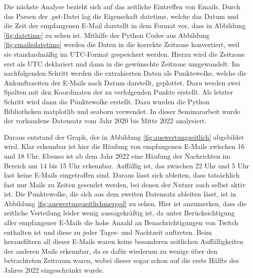 \noindent Die nächste Analyse bezieht sich auf das zeitliche Eintreffen von Emails. Durch das Parsen der .pst-Datei lag die Eigenschaft \glqq{}datetime\grqq, welche das Datum und die Zeit der empfangenen E-Mail darstellt in dem Format vor, dass in Abbildung \ref{fig:datetime} zu sehen ist. Mithilfe des Python Codes aus Abbildung \ref{fig:emailsdatetime} werden die Daten in die korrekte Zeitzone konvertiert, weil sie standardmäßig im UTC-Format gespeichert werden. Hierzu wird die Zeitzone erst als UTC deklariert und dann in die gewünschte Zeitzone umgewandelt. Im nachfolgenden Schritt werden die extrahierten Daten als Punktewolke, welche die Ankunftszeiten der E-Mails nach Datum darstellt, geplottet. Dazu werden zwei Spalten mit den Koordinaten der zu verfolgenden Punkte erstellt. Als letzter Schritt wird dann die Punktewolke erstellt. Dazu wurden die Python Bibliotheken \glqq{}matplotlib\grqq{} und \glqq{}seaborn\grqq{} verwendet. In dieser Seminararbeit wurde der vorhandene Datensatz vom Jahr 2020 bis Mitte 2022 analysiert. \smallskip

\noindent Daraus entstand der Graph, der in Abbildung \ref{fig:auswertungzeitlich} abgebildet wird. Klar erkennbar ist hier die Häufung von empfangenen E-Mails zwischen 16 und 18 Uhr. Ebenso ist ab dem Jahr 2022 eine Häufung der Nachrichten im Bereich um 14 bis 15 Uhr erkennbar. Auffällig ist, das zwischen 22 Uhr und 5 Uhr fast keine E-Mails eingetroffen sind. Daraus lässt sich ableiten, dass tatsächlich fast nur Mails zu Zeiten gesendet werden, bei denen der Nutzer auch selbst aktiv ist. Die Punktewolke, die sich aus dem zweiten Datensatz ableiten lässt, ist in Abbildung \ref{fig:auswertungzeitlichmerged} zu sehen. Hier ist anzumerken, dass die zeitliche Verteilung leider wenig aussagekräftig ist, da unter Berücksichtigung aller empfangener E-Mails die hohe Anzahl an Benachrichtigungen von \glqq{}Twitch\grqq{} enthalten ist und diese zu jeder Tages- und Nachtzeit auftreten. Beim herausfiltern all dieser E-Mails waren keine besonderen zeitlichen Auffälligkeiten der anderen Mails erkennbar, da es dafür wiederum zu wenige über den betrachteten Zeitraum waren, wobei dieser sogar schon auf die erste Hälfte des Jahres 2022 eingeschränkt wurde. \smallskip

